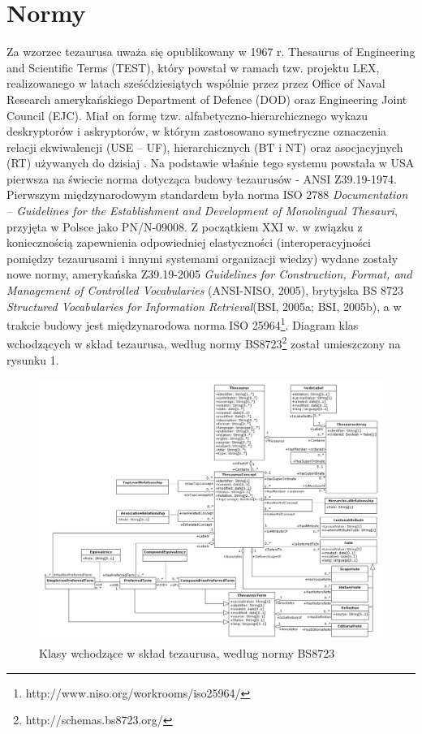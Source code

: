\section{Normy}
Za wzorzec tezaurusa uważa się opublikowany w 1967 r. Thesaurus of Engineering and Scientific Terms (TEST), który powstał w ramach tzw. projektu LEX, realizowanego w latach sześćdziesiątych wspólnie przez przez Office of Naval Research amerykańskiego Department of Defence (DOD) oraz Engineering Joint Council (EJC). Miał on formę tzw. alfabetyczno-hierarchicznego wykazu deskryptorów i askryptorów, w którym zastosowano symetryczne oznaczenia relacji ekwiwalencji (USE – UF), hierarchicznych (BT i NT) oraz asocjacyjnych (RT) używanych do dzisiaj \cite{Sosinska}. Na podstawie właśnie tego systemu powstała w USA pierwsza na świecie norma dotycząca budowy tezaurusów - ANSI Z39.19-1974.
Pierwszym międzynarodowym standardem była norma ISO 2788 \textit{Documentation – Guidelines for the Establishment and Development of Monolingual Thesauri}, przyjęta w Polsce jako PN/N-09008. Z początkiem XXI w. w związku z koniecznością zapewnienia odpowiedniej elastyczności (interoperacyjności pomiędzy tezaurusami i innymi systemami organizacji wiedzy) wydane zostały nowe normy, amerykańska Z39.19-2005 \textit{Guidelines for Construction, Format, and Management of Controlled Vocabularies} (ANSI-NISO, 2005), brytyjska BS 8723 \textit{Structured Vocabularies for Information Retrieval}(BSI, 2005a; BSI, 2005b), a w trakcie budowy jest międzynarodowa norma ISO 25964\footnote{http://www.niso.org/workrooms/iso25964/}.
Diagram klas wchodzących w skład tezaurusa, według normy BS8723\footnote{http://schemas.bs8723.org/} został umieszczony na rysunku 1. 

\begin{figure}[ht]
\centering
\includegraphics[width=13cm]{./Model.pdf}
\caption{Klasy wchodzące w skład tezaurusa, według normy BS8723}
\end{figure}


